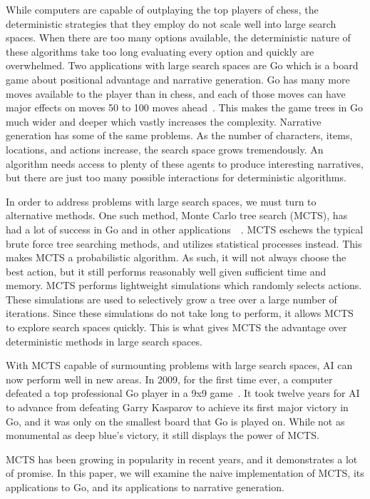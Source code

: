 \documentclass{sig-alternate}
\begin{document}
While computers are capable of outplaying the top players of chess, the deterministic strategies that they employ do not scale well into large search spaces. When there are too many options available, the deterministic nature of these algorithms take too long evaluating every option and quickly are overwhelmed. Two applications with large search spaces are Go which is a board game about positional advantage and narrative generation. Go has many more moves available to the player than in chess, and each of those moves can have major effects on moves 50 to 100 moves ahead~\cite{RAVEinGo}. This makes the game trees in Go much wider and deeper which vastly increases the complexity. Narrative generation has some of the same problems. As the number of characters, items, locations, and actions increase, the search space grows tremendously. An algorithm needs access to plenty of these agents to produce interesting narratives, but there are just too many possible interactions for deterministic algorithms.

In order to address problems with large search spaces, we must turn to alternative methods. One such method, Monte Carlo tree search (MCTS), has had a lot of success in Go and in other applications~\cite{TheGrandChallenge}~\cite{ActionSelection}. MCTS eschews the typical brute force tree searching methods, and utilizes statistical processes instead. This makes MCTS a probabilistic algorithm. As such, it will not always choose the best action, but it still performs reasonably well given sufficient time and memory. MCTS performs lightweight simulations which randomly selects actions. These simulations are used to selectively grow a tree over a large number of iterations. Since these simulations do not take long to perform, it allows MCTS to explore search spaces quickly. This is what gives MCTS the advantage over deterministic methods in large search spaces.

With MCTS capable of surmounting problems with large search spaces, AI can now perform well in new areas. In 2009, for the first time ever, a computer defeated a top professional Go player in a 9x9 game~\cite{TheGrandChallenge}. It took twelve years for AI to advance from defeating Garry Kasparov to achieve its first major victory in Go, and it was only on the smallest board that Go is played on. While not as monumental as deep blue's victory, it still displays the power of MCTS.

MCTS has been growing in popularity in recent years, and it demonstrates a lot of promise. In this paper, we will examine the naive implementation of MCTS, its applications to Go, and its applications to narrative generation.  
\end{document}

